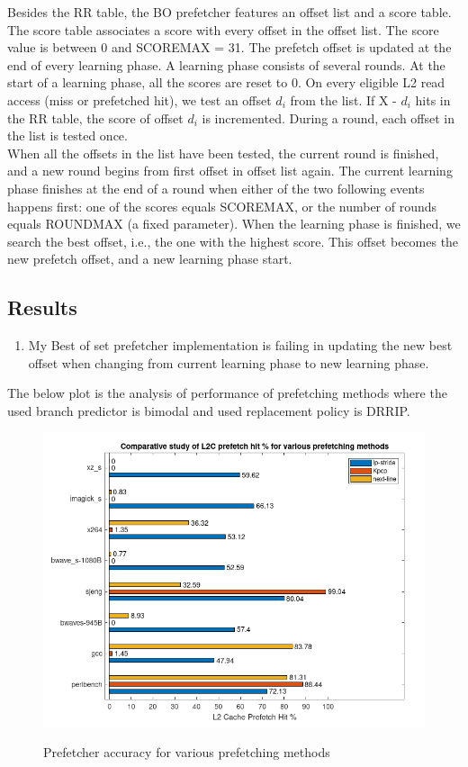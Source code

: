 \documentclass[a4paper]{article}
\begin{document}
        Besides the RR table, the BO prefetcher features an offset list and a score table. The score table associates a score with every offset in the offset list. The score value is between 0 and SCOREMAX = 31. The prefetch offset is updated at the end of every learning phase. A learning phase consists of several rounds. At the start of a learning phase, all the scores are reset to 0. On every eligible L2 read access (miss or prefetched hit), we test an offset $d_i$  from the list. If X - $d_i$ hits in the RR table, the score of offset $d_i$ is incremented. During a round, each offset in the list is tested once.\\

        When all the offsets in the list have been tested, the current round is finished, and a new round begins from first offset in offset list again. The current learning phase finishes at the end of a round when either of the two following events happens first: one of the scores equals SCOREMAX, or the number of rounds equals ROUNDMAX (a fixed parameter). When the learning phase is finished, we search the best offset, i.e., the one with the highest score. This offset becomes the new prefetch offset, and a new learning phase start.

        
     \subsection{Results}
        \begin{enumerate}
            \item My Best of set prefetcher implementation is failing in updating the new best offset when changing from current learning phase to new learning phase.
        \end{enumerate}
        
        The below plot is the analysis of performance of prefetching methods where the used branch predictor is bimodal and used replacement policy is DRRIP.
        
        \begin{figure}[H]
        \centering %
        {\includegraphics[width = 0.8 \linewidth]{images/Manish/plot.png}} %
        \caption{Prefetcher accuracy for various prefetching methods}
        \label{fig:exm} %
        \end{figure}
        
\end{document}
